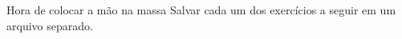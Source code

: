 \begin{frame}{Hora de colocar a mão na massa}
  Salvar cada um dos exercícios a seguir em um arquivo separado.
\end{frame}